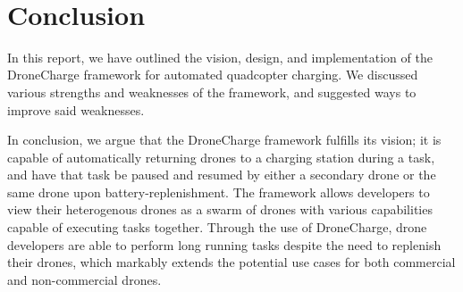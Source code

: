 \\
\section{Conclusion}
In this report, we have outlined the vision, design, and implementation of the DroneCharge framework for automated quadcopter charging. We discussed various strengths and weaknesses of the framework, and suggested ways to improve said weaknesses.

In conclusion, we argue that the DroneCharge framework fulfills its vision; it is capable of automatically returning drones to a charging station during a task, and have that task be paused and resumed by either a secondary drone or the same drone upon battery-replenishment. The framework allows developers to view their heterogenous drones as a swarm of drones with various capabilities capable of executing tasks together. Through the use of DroneCharge, drone developers are able to perform long running tasks despite the need to replenish their drones, which markably extends the potential use cases for both commercial and non-commercial drones.
